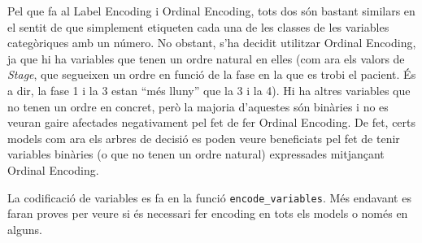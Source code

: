 Pel que fa al Label Encoding i Ordinal Encoding, tots dos són bastant similars en el sentit de que simplement etiqueten cada una de les classes de les variables categòriques amb un número. No obstant, s'ha decidit utilitzar Ordinal Encoding, ja que hi ha variables que tenen un ordre natural en elles (com ara els valors de \textit{Stage}, que segueixen un ordre en funció de la fase en la que es trobi el pacient. És a dir, la fase 1 i la 3 estan ``més lluny'' que la 3 i la 4). Hi ha altres variables que no tenen un ordre en concret, però la majoria d'aquestes són binàries i no es veuran gaire afectades negativament pel fet de fer Ordinal Encoding. De fet, certs models com ara els arbres de decisió es poden veure beneficiats pel fet de tenir variables binàries (o que no tenen un ordre natural) expressades mitjançant Ordinal Encoding.

La codificació de variables es fa en la funció \texttt{encode\_variables}. Més endavant es faran proves per veure si és necessari fer encoding en tots els models o només en alguns.
